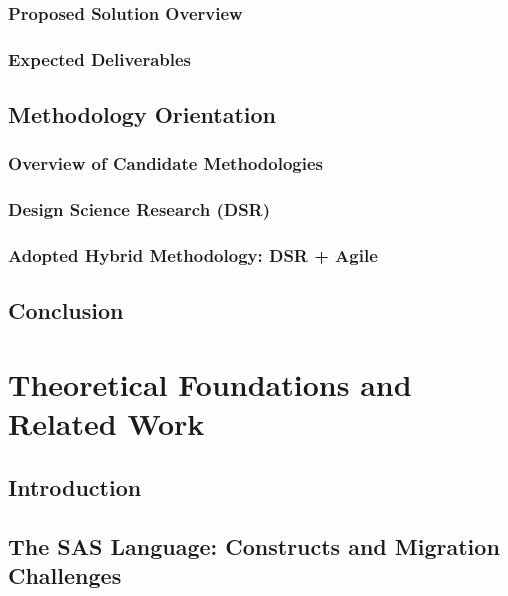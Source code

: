 \documentclass[12pt,a4paper]{report}
\begin{document}
  \subsection{Proposed Solution Overview}
  \label{subsec:proposed-solution}

  \subsection{Expected Deliverables}
  \label{subsec:deliverables}

\section{Methodology Orientation}
\label{sec:methodology}

  \subsection{Overview of Candidate Methodologies}
  \label{subsec:methodologies-overview}

  \subsection{Design Science Research (DSR)}
  \label{subsec:dsr}

  \subsection{Adopted Hybrid Methodology: DSR + Agile}
  \label{subsec:hybrid-methodology}

\section{Conclusion}
\label{sec:ch1-conclusion}


\chapter{Theoretical Foundations and Related Work}
\label{ch:foundations}

\section{Introduction}
\label{sec:ch2-intro}

\section{The SAS Language: Constructs and Migration Challenges}
\label{sec:sas-language}
\end{document}
